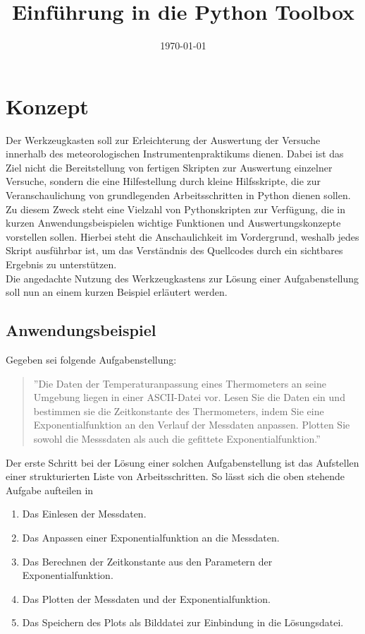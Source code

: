 \documentclass[a4paper,fleqn]{article}
\title{Einführung in die Python Toolbox}
\author{}
\date{\today}
\begin{document}
\maketitle

\section*{Konzept}
Der Werkzeugkasten soll zur Erleichterung der Auswertung der Versuche innerhalb
des meteorologischen Instrumentenpraktikums dienen. Dabei ist das Ziel nicht die
Bereitstellung von fertigen Skripten zur Auswertung einzelner Versuche, sondern
die eine Hilfestellung durch kleine Hilfsskripte, die zur Veranschaulichung von
grundlegenden Arbeitsschritten in Python dienen sollen.\\

Zu diesem Zweck steht eine Vielzahl von Pythonskripten zur Verfügung, die in
kurzen Anwendungsbeispielen wichtige Funktionen und Auswertungskonzepte
vorstellen sollen. Hierbei steht die Anschaulichkeit im Vordergrund, weshalb
jedes Skript ausführbar ist, um das Verständnis des Quellcodes durch ein
sichtbares Ergebnis zu unterstützen.\\

Die angedachte Nutzung des Werkzeugkastens zur Lösung einer Aufgabenstellung
soll nun an einem kurzen Beispiel erläutert werden.

\subsection*{Anwendungsbeispiel}
Gegeben sei folgende Aufgabenstellung:

\begin{quote}
''Die Daten der Temperaturanpassung eines Thermometers an seine Umgebung liegen
in einer ASCII-Datei vor. Lesen Sie die Daten ein und bestimmen sie die
Zeitkonstante des Thermometers, indem Sie eine Exponentialfunktion an den
Verlauf der Messdaten anpassen. Plotten Sie sowohl die Messsdaten als auch die
gefittete Exponentialfunktion.''
\end{quote}

Der erste Schritt bei der Lösung einer solchen Aufgabenstellung ist das
Aufstellen einer strukturierten Liste von Arbeitsschritten. So lässt sich die
oben stehende Aufgabe aufteilen in

\begin{enumerate}
  \item Das Einlesen der Messdaten.
  \item Das Anpassen einer Exponentialfunktion an die Messdaten.
  \item Das Berechnen der Zeitkonstante aus den Parametern der Exponentialfunktion.
  \item Das Plotten der Messdaten und der Exponentialfunktion.
  \item Das Speichern des Plots als Bilddatei zur Einbindung in die Lösungsdatei.
\end{enumerate}
\end{document}
